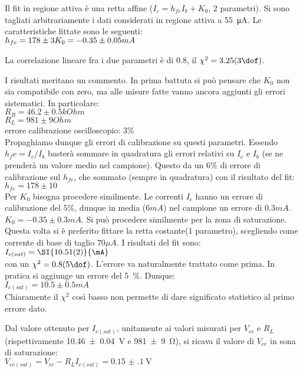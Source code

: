 Il fit in regione attiva è una retta affine ($I_c = h_{fe} I_b + K_0$, 2 parametri). Si sono tagliati arbitrariamente i dati considerati in regione attiva a \SI{55}{\micro\ampere}. Le caratteristiche fittate sono le seguenti: \\
$h_{fe}=178  \pm 3 \\
K_0=-0.35 \pm 0.05 mA$

La correlazione lineare fra i due parametri è di $0.8$, il $\chi^2=3.25 (3\dof)$.

I risultati meritano un commento. In prima battuta si può pensare che $K_0$ non sia compatibile con zero, ma alle misure fatte vanno ancora aggiunti gli errori sistematici. In particolare:\\
$R_B=46.2 \pm 0.5 kOhm$\\
$R_L=981\pm 9 Ohm$\\
errore calibrazione oscilloscopio: $3\%$ \\
Propaghiamo dunque gli errori di calibrazione su questi parametri. Essendo $h_fe=I_c/I_b$ basterà sommare in quadratura gli errori relativi su $I_c$ e $I_b$ (se ne prenderà un valore medio nel campione). Questo da un $6\%$ di errore di calibrazione sul $h_{fe}$, che sommato (sempre in quadratura) con il risultato del fit:\\
 $h_{fe}=178\pm 10$\\
Per $K_0$ bisogna procedere similmente. Le correnti $I_c$ hanno un errore di calibrazione del $5\%$, dunque in media ($6 m A$) nel campione un errore di $0.3 m A$.
$K_0=-0.35 \pm 0.3 mA$. 
Si può procedere similmente per la zona di saturazione. Questa volta si è preferito fittare la retta costante(1 parametro), scegliendo come corrente di base di taglio $70 \mu A$. I risultati del fit sono:\\
$I_{c(sat)}= \SI{10.51 (2) }{\mA}$\\
con un $\chi^2=0.8 (5 \dof)$.
L'errore va naturalmente trattato come prima. In pratica si aggiunge un errore del \SI{5}{\percent}. Dunque:\\
$I_{c(sat)}=10.5 \pm 0.5 mA$\\
Chiaramente il $\chi^2$ così basso non permette di dare significato statistico al primo errore dato.

Dal valore ottenuto per $I_{c(sat)}$, unitamente ai valori misurati per $V_{cc}$ e $R_L$ (rispettivamente \SI{10.46(4)}{\V} e \SI{981(9)}{\ohm}), si ricava il valore di $V_{ce}$ in sona di saturazione: \\
$V_{ce(sat)} = V_{cc} - R_L I_{c(sat)} = \SI{0.15(10)}{\V}$

